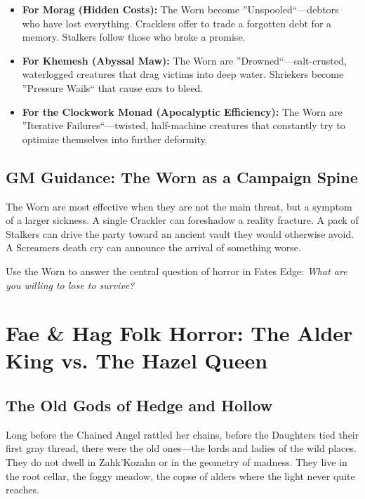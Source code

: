 \documentclass[11pt]{article}
\begin{document}
\begin{itemize}
\item \textbf{For Morag (Hidden Costs):} The Worn become ''Unspooled``---debtors who have lost everything. Cracklers offer to trade a forgotten debt for a memory. Stalkers follow those who broke a promise.
\item \textbf{For Khemesh (Abyssal Maw):} The Worn are ''Drowned``---salt-crusted, waterlogged creatures that drag victims into deep water. Shriekers become ''Pressure Wails`` that cause ears to bleed.
\item \textbf{For the Clockwork Monad (Apocalyptic Efficiency):} The Worn are ''Iterative Failures``---twisted, half-machine creatures that constantly try to optimize themselves into further deformity.
\end{itemize}

\subsection{GM Guidance: The Worn as a Campaign Spine}

The Worn are most effective when they are not the main threat, but a symptom of a larger sickness. A single Crackler can foreshadow a reality fracture. A pack of Stalkers can drive the party toward an ancient vault they would otherwise avoid. A Screamer\textquotesingle s death cry can announce the arrival of something worse.

Use the Worn to answer the central question of horror in Fate\textquotesingle s Edge: \textit{What are you willing to lose to survive?}

\vspace{1em}
\noindent
{}

\newpage
\section{Fae \& Hag Folk Horror: The Alder King vs. The Hazel Queen}

\subsection{The Old Gods of Hedge and Hollow}

Long before the Chained Angel rattled her chains, before the Daughters tied their first gray thread, there were the old ones---the lords and ladies of the wild places. They do not dwell in Zahk'Kozahn or in the geometry of madness. They live in the root cellar, the foggy meadow, the copse of alders where the light never quite reaches.
\end{document}
